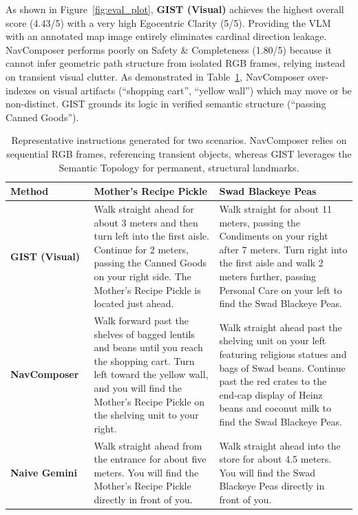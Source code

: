 \documentclass[sigconf,anonymous,review]{acmart}
\begin{document}
As shown in Figure~\ref{fig:eval_plot}, \textbf{GIST (Visual)} achieves the highest overall score (4.43/5) with a very high Egocentric Clarity (5/5). Providing the VLM with an annotated map image entirely eliminates cardinal direction leakage. NavComposer performs poorly on Safety \& Completeness (1.80/5) because it cannot infer geometric path structure from isolated RGB frames, relying instead on transient visual clutter. As demonstrated in Table~\ref{tab:examples}, NavComposer over-indexes on visual artifacts (``shopping cart'', ``yellow wall'') which may move or be non-distinct. GIST grounds its logic in verified semantic structure (``passing Canned Goods'').

\begin{table}[t]
\centering
\caption{Representative instructions generated for two scenarios. NavComposer relies on sequential RGB frames, referencing transient objects, whereas GIST leverages the Semantic Topology for permanent, structural landmarks.}
\label{tab:examples}
\small
\begin{tabular}{p{} p{} p{}}
\toprule
\textbf{Method} & \textbf{Mother's Recipe Pickle} & \textbf{Swad Blackeye Peas} \\
\midrule
\textbf{GIST (Visual)} & Walk straight ahead for about 3 meters and then turn left into the first aisle. Continue for 2 meters, passing the Canned Goods on your right side. The Mother's Recipe Pickle is located just ahead. & Walk straight for about 11 meters, passing the Condiments on your right after 7 meters. Turn right into the first aisle and walk 2 meters further, passing Personal Care on your left to find the Swad Blackeye Peas. \\
\addlinespace
\textbf{NavComposer~\cite{he2025navcomposer}} & Walk forward past the shelves of bagged lentils and beans until you reach the shopping cart. Turn left toward the yellow wall, and you will find the Mother's Recipe Pickle on the shelving unit to your right. & Walk straight ahead past the shelving unit on your left featuring religious statues and bags of Swad beans. Continue past the red crates to the end-cap display of Heinz beans and coconut milk to find the Swad Blackeye Peas. \\
\addlinespace
\textbf{Naive Gemini} & Walk straight ahead from the entrance for about five meters. You will find the Mother's Recipe Pickle directly in front of you. & Walk straight ahead into the store for about 4.5 meters. You will find the Swad Blackeye Peas directly in front of you. \\
\bottomrule
\end{tabular}
\end{table}
\end{document}
